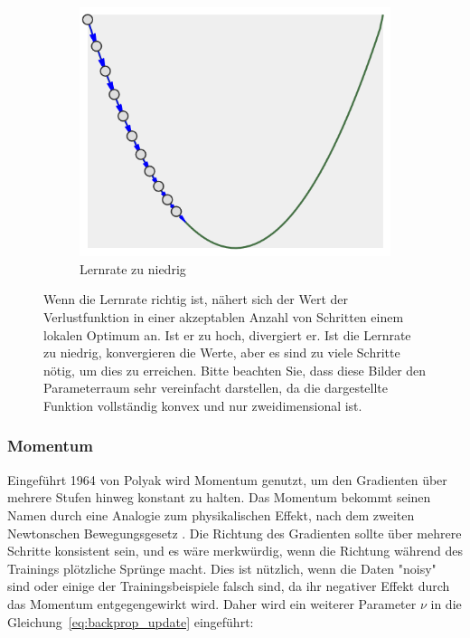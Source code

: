 \begin{figure}
\begin{subfigure}[b]{0.3\textwidth}
        \includegraphics[width=\textwidth]{images/lr_too_low.png}
        \caption{Lernrate zu niedrig}
        \label{fig:lr_too-low}
    \end{subfigure}
    \caption{Wenn die Lernrate richtig ist, nähert sich der Wert der Verlustfunktion in einer akzeptablen Anzahl von Schritten einem lokalen Optimum an.
    Ist er zu hoch, divergiert er.
    Ist die Lernrate zu niedrig, konvergieren die Werte, aber es sind zu viele Schritte nötig, um dies zu erreichen.
    Bitte beachten Sie, dass diese Bilder den Parameterraum sehr vereinfacht darstellen, da die dargestellte Funktion vollständig konvex und nur zweidimensional ist.}
    \label{fig:learning_rate}
\end{figure}

\subsubsection{Momentum}

Eingeführt 1964 von Polyak \cite{Polyak1964} wird Momentum genutzt, um den Gradienten über mehrere Stufen hinweg konstant zu halten.
Das Momentum bekommt seinen Namen durch eine Analogie zum physikalischen Effekt, nach dem zweiten Newtonschen Bewegungsgesetz \cite[S.12]{Newton1687}.
Die Richtung des Gradienten sollte über mehrere Schritte konsistent sein, und es wäre merkwürdig, wenn die Richtung während des Trainings plötzliche Sprünge macht.
Dies ist nützlich, wenn die Daten "noisy" sind oder einige der Trainingsbeispiele falsch sind, da ihr negativer Effekt durch das Momentum entgegengewirkt wird.
Daher wird ein weiterer Parameter $\nu$ in die Gleichung~\eqref{eq:backprop_update} eingeführt:


